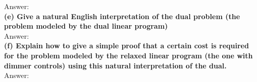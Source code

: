 \documentclass{article}
\begin{document}
Answer: \\ \newline
\textbf{(e) Give a natural English interpretation of the dual problem (the problem modeled by the dual linear program)} \\ \newline
Answer: \\ \newline
\textbf{(f) Explain how to give a simple proof that a certain cost is required for the problem modeled by the relaxed linear program (the one with dimmer controls) using this natural interpretation of the dual.} \\ \newline
Answer: 
\end{document}
